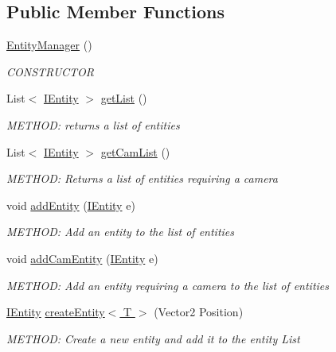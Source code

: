 \subsection*{Public Member Functions}
\begin{DoxyCompactItemize}
\item 
\hyperlink{a00518_a0fd18e00f80a32046831041574e8a6a8}{Entity\+Manager} ()
\begin{DoxyCompactList}\small\item\em C\+O\+N\+S\+T\+R\+U\+C\+T\+OR \end{DoxyCompactList}\item 
List$<$ \hyperlink{a00438}{I\+Entity} $>$ \hyperlink{a00518_a704e3c8fb916a8bb668ffd30654b4e18}{get\+List} ()
\begin{DoxyCompactList}\small\item\em M\+E\+T\+H\+OD\+: returns a list of entities \end{DoxyCompactList}\item 
List$<$ \hyperlink{a00438}{I\+Entity} $>$ \hyperlink{a00518_a13ec76267682ed1ce3ace63c561ec6c5}{get\+Cam\+List} ()
\begin{DoxyCompactList}\small\item\em M\+E\+T\+H\+OD\+: Returns a list of entities requiring a camera \end{DoxyCompactList}\item 
void \hyperlink{a00518_a33cf4a636f70486e8a13c52bb4395cd6}{add\+Entity} (\hyperlink{a00438}{I\+Entity} e)
\begin{DoxyCompactList}\small\item\em M\+E\+T\+H\+OD\+: Add an entity to the list of entities \end{DoxyCompactList}\item 
void \hyperlink{a00518_a5b84d299c11d42065f55048dd14fdd4c}{add\+Cam\+Entity} (\hyperlink{a00438}{I\+Entity} e)
\begin{DoxyCompactList}\small\item\em M\+E\+T\+H\+OD\+: Add an entity requiring a camera to the list of entities \end{DoxyCompactList}\item 
\hyperlink{a00438}{I\+Entity} \hyperlink{a00518_a228280a4515648318fb5528936249a8b}{create\+Entity$<$ T $>$} (Vector2 Position)
\begin{DoxyCompactList}\small\item\em M\+E\+T\+H\+OD\+: Create a new entity and add it to the entity List \end{DoxyCompactList}\item 

\end{DoxyCompactItemize}
